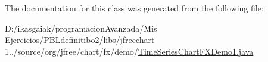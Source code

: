 The documentation for this class was generated from the following file\+:\begin{DoxyCompactItemize}
\item 
D\+:/ikasgaiak/programacion\+Avanzada/\+Mis Ejercicios/\+P\+B\+Ldefinitibo2/libs/jfreechart-\/1../source/org/jfree/chart/fx/demo/\mbox{\hyperlink{_time_series_chart_f_x_demo1_8java}{Time\+Series\+Chart\+F\+X\+Demo1.\+java}}\end{DoxyCompactItemize}
